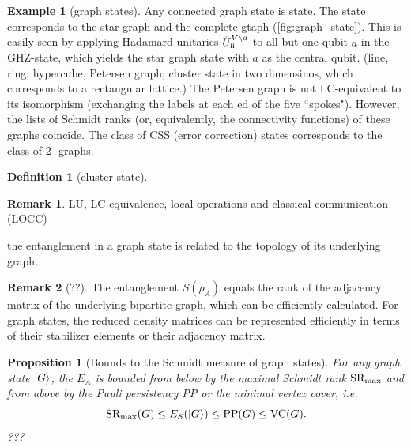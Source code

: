 \documentclass[
10pt,
aps,
pra,
linenumbers,
floatfix,
]{revtex4-2}
\theoremstyle{plain}
\newtheorem{proposition}{Proposition}
\newtheorem{question}{Question}
\theoremstyle{definition}
\newtheorem{definition}{Definition}
\newtheorem{observation}{Observation}
\newtheorem{example}{Example}
\newtheorem{remark}{Remark}
\newtheorem{problem}{Problem}
\newcommand{\U}{\hat{U}}
\newcommand{\dm}{\rho}
\begin{document}
\begin{example}[graph states]
	Any connected graph state is  state.
	The  state corresponds to the star graph and the complete gtaph (\cref{fig:graph_state}). 
	This is easily seen by applying Hadamard unitaries $\U_\hdm^{V\backslash a}$ to all but one qubit $a$ in the GHZ-state, 
	which yields the star graph state with $a$ as the central qubit.
	(line, ring; 
	hypercube, Petersen graph; 
	cluster state in two dimensinos, which corresponds to a rectangular lattice.)
	The Petersen graph is not LC-equivalent to its isomorphism (exchanging the labels at each ed of the five ``spokes"). However, the lists of Schmidt ranks (or, equivalently, the connectivity functions) of these graphs coincide.
	The class of CSS (error correction) states corresponds to the class of 2- graphs.
	\cite{heinEntanglementGraphStates2006}
\end{example}
\begin{definition}[cluster state]\label{def:cluster_state}
\end{definition}
\begin{remark}
	LU, LC equivalence, local operations and classical communication (LOCC)
\end{remark}
the entanglement in a graph state is related to the topology of its underlying graph.

\begin{remark}[??]
	The entanglement  $S( \dm_A )$ equals the rank of the adjacency matrix of the underlying bipartite graph, which can be efficiently calculated.
	For graph states, the reduced density matrices can be represented efficiently in terms of their stabilizer elements or their adjacency matrix.
\end{remark}

\begin{proposition}[Bounds to the Schmidt measure of graph states]
	For any graph state $\ket{G}$, the  $E_A$ is bounded from below by the maximal Schmidt rank $\textup{SR}_{\max}$ and from above by the Pauli persistency PP or the minimal vertex cover, i.e.
	\begin{equation}
		\textup{SR}_{\max} (G) \le E_S(\ket{G}) \le \textup{PP}(G) \le \textup{VC}(G).
	\end{equation}
	???
\end{proposition}
\end{document}
